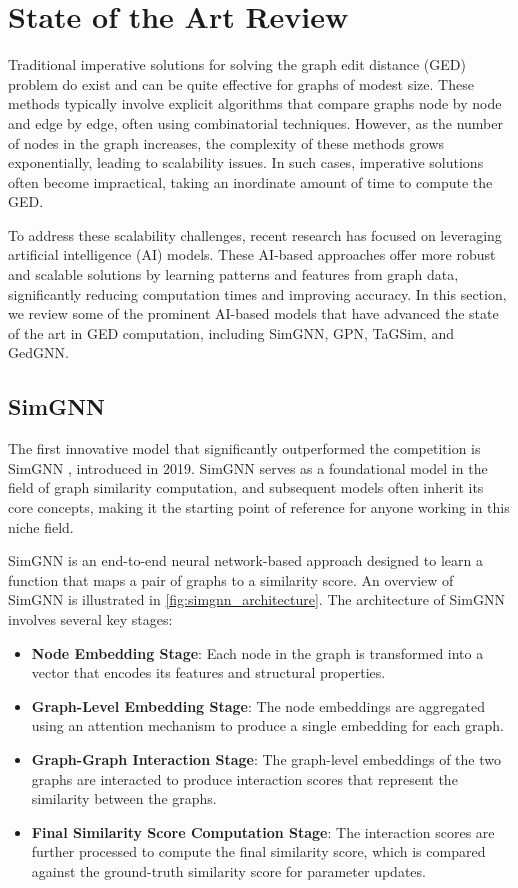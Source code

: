 \documentclass[../Thesis.tex]{subfiles}
\begin{document}
	
	\section{State of the Art Review}
	\label{sec:state_of_the_art_review}
	
	Traditional imperative solutions for solving the graph edit distance (GED) problem do exist and can be quite effective for graphs of modest size. These methods typically involve explicit algorithms that compare graphs node by node and edge by edge, often using combinatorial techniques. However, as the number of nodes in the graph increases, the complexity of these methods grows exponentially, leading to scalability issues. In such cases, imperative solutions often become impractical, taking an inordinate amount of time to compute the GED.
	
	To address these scalability challenges, recent research has focused on leveraging artificial intelligence (AI) models. These AI-based approaches offer more robust and scalable solutions by learning patterns and features from graph data, significantly reducing computation times and improving accuracy. In this section, we review some of the prominent AI-based models that have advanced the state of the art in GED computation, including SimGNN, GPN, TaGSim, and GedGNN.
	
	\subsection{SimGNN}

	The first innovative model that significantly outperformed the competition is SimGNN \cite{simgnn__a_neural_network_approach_to_fast_graph_similarity_computation}, introduced in 2019. SimGNN serves as a foundational model in the field of graph similarity computation, and subsequent models often inherit its core concepts, making it the starting point of reference for anyone working in this niche field.
	
	SimGNN is an end-to-end neural network-based approach designed to learn a function that maps a pair of graphs to a similarity score. An overview of SimGNN is illustrated in \autoref{fig:simgnn_architecture}. The architecture of SimGNN involves several key stages:
	
	\begin{itemize}
		\item \textbf{Node Embedding Stage}: Each node in the graph is transformed into a vector that encodes its features and structural properties.
		\item \textbf{Graph-Level Embedding Stage}: The node embeddings are aggregated using an attention mechanism to produce a single embedding for each graph.
		\item \textbf{Graph-Graph Interaction Stage}: The graph-level embeddings of the two graphs are interacted to produce interaction scores that represent the similarity between the graphs.
		\item \textbf{Final Similarity Score Computation Stage}: The interaction scores are further processed to compute the final similarity score, which is compared against the ground-truth similarity score for parameter updates.
	\end{itemize}
	
\end{document}
